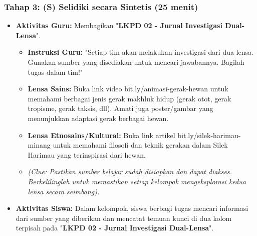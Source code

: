 \documentclass[a4paper,12pt]{article}
\begin{document}
\subsubsection{Tahap 3: (S) Selidiki secara Sintetis (25 menit)}
\begin{itemize}
\item \textbf{Aktivitas Guru:} Membagikan "\textbf{LKPD 02 - Jurnal Investigasi Dual-Lensa}".
    \begin{itemize}
    \item \textbf{Instruksi Guru:} "Setiap tim akan melakukan investigasi dari dua lensa. Gunakan sumber yang disediakan untuk mencari jawabannya. Bagilah tugas dalam tim!"
    \item \textbf{Lensa Sains:} Buka link video bit.ly/animasi-gerak-hewan untuk memahami berbagai jenis gerak makhluk hidup (gerak otot, gerak tropisme, gerak taksis, dll). Amati juga poster/gambar yang menunjukkan adaptasi gerak berbagai hewan.
    \item \textbf{Lensa Etnosains/Kultural:} Buka link artikel bit.ly/silek-harimau-minang untuk memahami filosofi dan teknik gerakan dalam Silek Harimau yang terinspirasi dari hewan.
    \item \textit{(Clue: Pastikan sumber belajar sudah disiapkan dan dapat diakses. Berkelilinglah untuk memastikan setiap kelompok mengeksplorasi kedua lensa secara seimbang).}
    \end{itemize}
\item \textbf{Aktivitas Siswa:} Dalam kelompok, siswa berbagi tugas mencari informasi dari sumber yang diberikan dan mencatat temuan kunci di dua kolom terpisah pada "\textbf{LKPD 02 - Jurnal Investigasi Dual-Lensa}".
\end{itemize}
\end{document}
